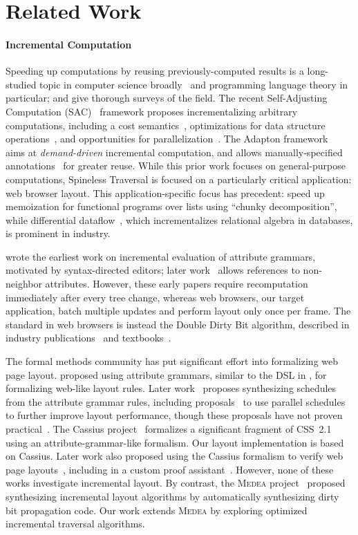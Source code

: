 \section{Related Work}

\paragraph{Incremental Computation}
Speeding up computations
  by reusing previously-computed results
  is a long-studied topic in computer science broadly~\cite{memo}
  and programming language theory in particular;
  \citet{IC-Survey} and \citet{IC-bib}
  give thorough surveys of the field.
The recent Self-Adjusting Computation (SAC)~\cite{SAC} framework
  proposes incrementalizing arbitrary computations,
  including a cost semantics~\cite{SACCost},
  optimizations for data structure operations~\cite{SACTrace},
  and opportunities for parallelization~\cite{PSAC}.
The Adapton framework~\cite{Adapton}
  aims at \emph{demand-driven} incremental computation,
  and allows manually-specified annotations~\cite{AdaptonName}
  for greater reuse.
While this prior work focuses on general-purpose computations,
  Spineless Traversal is focused on a particularly critical application: web browser layout.
This application-specific focus has precedent:
  \citet{ICC} speed up memoization for functional programs over lists
  using ``chunky decomposition'',
  while differential dataflow~\cite{DDF},
  which incrementalizes relational algebra in databases,
  is prominent in industry.

\citet{TR1} wrote the earliest work
  on incremental evaluation of attribute grammars,
  motivated by syntax-directed editors;
  later work~\cite{TR2} allows references
  to non-neighbor attributes.
However, these early papers require recomputation
  immediately after every tree change,
  whereas web browsers, our target application,
  batch multiple updates
  and perform layout only once per frame.
The standard in web browsers is instead
  the Double Dirty Bit algorithm,
  described in industry publications~\cite{tali-garseil}
  and textbooks~\cite{wbe}.
  
The formal methods community has put significant effort
  into formalizing web page layout.
\citet{meyerovich-1} proposed using attribute grammars,
  similar to the DSL in ,
  for formalizing web-like layout rules.
Later work~\cite{yufeng-1} proposes
  synthesizing schedules from the attribute grammar rules,
  including proposals~\cite{meyerovich-2,meyerovich-3}
  to use parallel schedules to further improve layout performance,
  though these proposals have not proven practical~\cite{servo-no-parallel}.
The Cassius project~\cite{cassius-1}
  formalizes a significant fragment of CSS~2.1
  using an attribute-grammar-like formalism.
Our layout implementation is based on Cassius.
Later work also proposed
  using the Cassius formalism to verify web page layouts~\cite{cassius-2},
  including in a custom proof assistant~\cite{cassius-3}.
However, none of these works investigate incremental layout.
By contrast, the \textsc{Medea} project~\cite{yufeng-2}
  proposed synthesizing incremental layout algorithms
  by automatically synthesizing dirty bit propagation code.
Our work extends \textsc{Medea} by exploring
  optimized incremental traversal algorithms.
